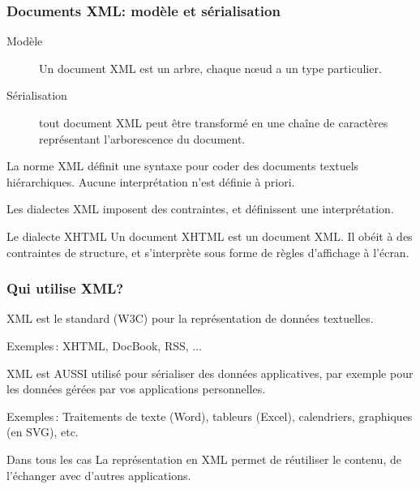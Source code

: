 \begin{frame}[fragile]
\frametitle{Documents XML: modèle et sérialisation}

\begin{description}

\item [Modèle] Un document XML est un arbre, chaque n{\oe}ud a un type particulier.

\item [Sérialisation] tout document XML peut être transformé en une chaîne
   de caractères représentant l'arborescence du document.

\end{description}

La norme XML définit une \alert{syntaxe} pour coder des documents textuels
hiérarchiques. Aucune interprétation n'est
définie à priori.

\vfill

Les dialectes XML imposent des contraintes, et définissent une interprétation.

\vfill

\begin{beamerboxesrounded}{Le dialecte XHTML}
Un document XHTML est un document XML. Il obéit à des contraintes de structure, et s'interprète
sous forme de règles d'affichage à l'écran.
\end{beamerboxesrounded}

\end{frame}

\begin{frame}[fragile]
\frametitle{Qui utilise XML?}

XML est le standard (W3C) pour la représentation  de données textuelles.

\vfill
\alert{Exemples}\,: XHTML, DocBook, RSS, ...

\vfill

XML est AUSSI utilisé pour sérialiser des données applicatives, par exemple pour les données
gérées par vos applications personnelles.


\vfill

\alert{Exemples}\,: Traitements de texte (Word), tableurs (Excel), calendriers, graphiques (en SVG), etc.

\vfill

\begin{beamerboxesrounded}{Dans tous les cas}
La représentation en XML permet de \alert{réutiliser} le contenu, de \alert{l'échanger} avec d'autres applications.
\end{beamerboxesrounded}

\end{frame}

